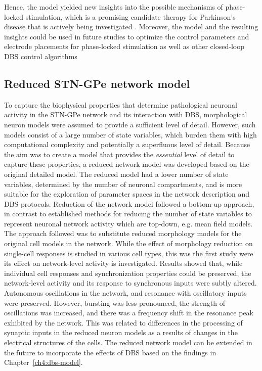 Hence, the model yielded new insights into the possible mechanisms
of phase-locked stimulation, which is a promising candidate therapy for
Parkinson's disease that is actively being investigated \cite{holt_phase-dependent_2019}.
Moreover, the model and the resulting insights could be used in future
studies to optimize the control parameters and electrode placements
for phase-locked stimulation as well as other closed-loop DBS control algorithms

\subsection{Reduced STN-GPe network model}
%
%
%
%
%
To capture the biophysical properties that determine pathological neuronal activity
in the STN-GPe network and its interaction with DBS, morphological neuron models
were assumed to provide a sufficient level of detail. However, such models
consist of a large number of state variables, which burden them with high computational
complexity and potentially a superfluous level of detail.
Because the aim was to create a model that provides the \textit{essential}
level of detail to capture these properties, a reduced network model was
developed based on the original detailed model. The reduced model
had a lower number of state variables, determined by the number of neuronal
compartments, and is more suitable for the exploration of parameter
spaces in the network description and DBS protocols.
%
Reduction of the network model followed a bottom-up approach, in contrast
to established methods for reducing the number of state variables to represent
neuronal network activity which are top-down, e.g. mean field models.
The approach followed was to substitute reduced morphology models for the
original cell models in the network. While the effect of morphology reduction
on single-cell responses is studied in various cell types, this was the first
study were its effect on network-level activity is investigated. Results showed that,
while individual cell responses and synchronization properties could be preserved, the
network-level activity and its response to synchronous inputs were subtly
altered. Autonomous oscillations in the network, and resonance with oscillatory
inputs were preserved. However, bursting was less pronounced, the strength
of oscillations was increased, and there was a frequency shift in the resonance
peak exhibited by the network. This was related to differences in the processing
of synaptic inputs in the reduced neuron models as a results of changes
in the electrical structures of the cells. The reduced network model can
be extended in the future to incorporate the effects of DBS based on the
findings in Chapter~\ref{ch4:dbs-model}.

